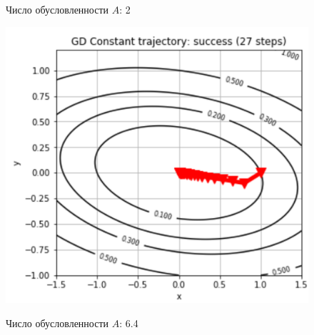 \begin{figure}[H]
            \label{ris:im225}
            \caption{Число обусловленности $A$: 2}
            \endminipage\hfill
            \centering
            \includegraphics[scale=0.25]{images/2-3-traj6.png}
            \label{ris:im225}
            \caption{Число обусловленности $A$: 6.4}
            \endminipage\hfill
\end{figure}